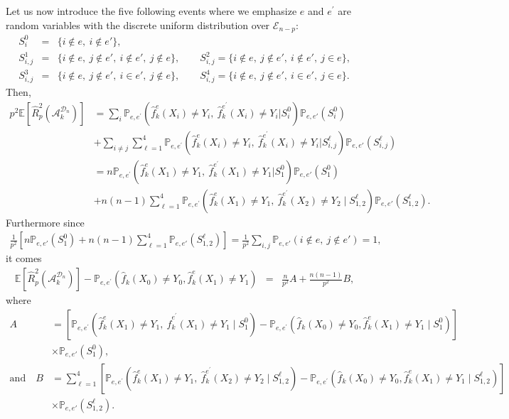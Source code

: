 \documentclass[twoside,11pt]{article}
\numberwithin{equation}{section}
\newcommand{\probi}[2]{\mathbb{P}_{#1}\left( #2 \right)}
\newcommand{\esp}[1]{\mathbb{E}\left[#1 \right]}
\newcommand{\f}[1]{ \widehat{f}_k( #1 ) }
\newcommand{\fe}[1]{ \widehat{f}_k^e(#1 ) }
\newcommand{\fep}[1]{ \widehat{f}_k^{e^\prime}(#1 ) }
\newcommand{\1}{\mathds{1}}%
\newcommand{\paren}[1]{\left( #1 \right)}
\renewcommand{\P}{\mathbb{P}}
\newcommand{\Rh}{\widehat{R}}
\newcommand{\Dn}{\mathcal{D}_n}
\newcommand{\A}{\mathcal{A}}
\newcommand{\Enp}{\mathcal{E}_{n-p}}
\numberwithin{equation}{section}
\theoremstyle{plain}
\begin{document}
Let us now introduce the five following events where we emphasize $e$ and $e^\prime$ are random variables with the discrete uniform distribution over $\Enp$:
\begin{eqnarray*}
S^{0}_{i}&=&\{ i \notin e,\ i \notin e' \},\\
%
S^{1}_{i,j} &=& \{ i \notin e,\ j \notin e',\ i \notin e',\ j \notin e \},\qquad
S^{2}_{i,j} = \{ i \notin e,\ j \notin e',\ i \notin e',\ j \in e \},\\
%
S^{3}_{i,j} &=& \{i \notin e,\ j \notin e',\ i \in e',\ j \notin e \},\qquad
S^{4}_{i,j} = \{ i \notin e,\ j \notin e',\ i \in e',\ j \in e \} .
\end{eqnarray*}
%
Then,
\begin{align*}
p^2\esp{\Rh_p^2(\A_k^{\Dn})}
&= \sum_{i}\P_{e,e^\prime} \paren{\fe{X_i}\neq Y_i,\ \fep{X_i}\neq Y_i | S^{0}_{i}} \probi{e,e'}{S^{0}_{i}}\\
%
&+\sum_{i\neq j}\sum_{\ell=1}^{4} \P_{e,e^\prime} \paren{\fe{X_i}\neq Y_i,\ \fep{X_i}\neq Y_i | S^{\ell}_{i,j}} \probi{e,e'}{S^{\ell}_{i,j}}\\
%
&= n\P_{e,e^\prime} \paren{\fe{X_1}\neq Y_1,\ \fep{X_1}\neq Y_1 | S^{0}_{1}} \probi{e,e'}{S^{0}_{1}}\\
%
&  +n(n-1)\sum_{\ell=1}^{4} \P_{e,e^\prime} \paren{\fe{X_1}\neq Y_1,\ \fep{X_2}\neq Y_2 \mid S^{\ell}_{1,2}} \probi{e,e'}{S^{\ell}_{1,2}} .
\end{align*}
%
Furthermore since
\begin{eqnarray*}
\frac{1}{p^2}\left[n\probi{e,e'}{S^{0}_{1}}+
n(n-1)\sum_{\ell=1}^{4} \probi{e,e'}{S^{\ell}_{1,2}}\right] = \frac{1}{p^2}\sum_{i,j}\probi{e,e'}{i\notin e,\ j\notin e'} = 1 ,
\end{eqnarray*}
it comes
\begin{eqnarray}\label{Equ : DecompositionPartI}
\esp{\Rh_p^2(\A_k^{\Dn})} - \P_{e,e^\prime} \paren{\f{X_0}\neq Y_0,\fe{X_{1}}\neq Y_{1}} &=& \frac{n}{p^2}A + \frac{n(n-1)}{p^2}B ,
\end{eqnarray}
where
\begin{align*}
A & = \left[\P_{e,e^\prime} \paren{\fe{X_1}\neq Y_1,\ \fep{X_1}\neq Y_1 \mid S^{0}_{1}}  - \P_{e,e^\prime} \paren{\f{X_0}\neq Y_0,\fe{X_{1}}\neq Y_{1} \mid S^{0}_{1}}\right] \\
& \times  \probi{e,e'}{S^{0}_{1}} ,\\
%
\mbox{and}\quad B & = \sum_{\ell=1}^{4} \left[ \P_{e,e^\prime} \paren{\fe{X_1}\neq Y_1,\ \fep{X_2}\neq Y_2 \mid S^{\ell}_{1,2}}  - \P_{e,e^\prime} \paren{\f{X_0}\neq Y_0,\fe{X_{1}}\neq Y_{1} \mid S^{\ell}_{1,2}} \right] \\
& \times  \probi{e,e'}{S^{\ell}_{1,2}} .
\end{align*}
\end{document}
